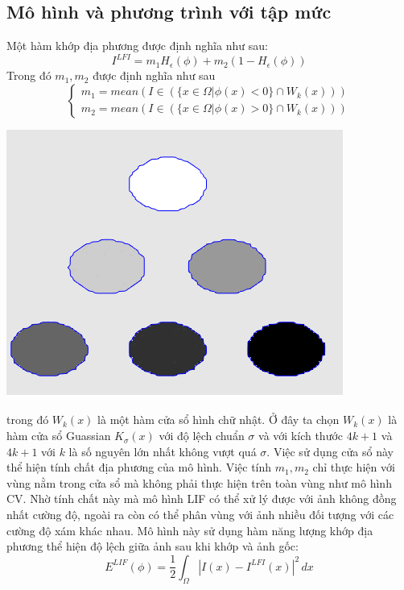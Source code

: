 \documentclass[12pt, oneside, a4]{book}
\begin{document}
\subsection{Mô hình và phương trình với tập mức}
Một hàm khớp địa phương được định nghĩa như sau:
\begin{equation*}
I^{LFI}= m_1H_{\epsilon}(\phi)+m_2(1-H_{\epsilon}(\phi))
\end{equation*}
Trong đó $m_1,m_2$ được định nghĩa như sau
\begin{equation*}
\begin{cases}
 m_1=mean(I\in (\{x\in \Omega|\phi(x)<0\}\cap W_k(x)))\\
  m_2=mean(I\in (\{x\in \Omega|\phi(x)>0\}\cap W_k(x)))
   \end{cases}
\end{equation*}
\begin{center}
\includegraphics[scale=.7]{figure/3clif1.png}
\end{center}
trong đó $W_k(x)$ là một hàm cửa sổ hình chữ nhật. Ở đây ta chọn $W_k(x)$  là hàm cửa sổ Guassian $K_{\sigma}(x)$ với độ lệch chuẩn $\sigma$ và với kích thước $4k+1$ và $4k+1$ với $k$ là số nguyên lớn nhất không vượt quá $\sigma$. Việc sử dụng cửa sổ này thể hiện tính chất địa phương của mô hình. Việc tính $m_1, m_2$ chỉ thực hiện với vùng nằm trong cửa sổ mà không phải thực hiện trên toàn vùng như mô hình CV. Nhờ tính chất này mà mô hình LIF có thể xử lý được với ảnh không đồng nhất cường độ, ngoài ra còn có thể phân vùng với ảnh nhiều đối tượng với các cường độ xám khác nhau. Mô hình này sử dụng hàm năng lượng khớp địa phương thể hiện độ lệch giữa ảnh sau khi khớp và ảnh gốc:
\begin{equation*}
E^{LIF}(\phi)=\dfrac{1}{2}\int_{\Omega}|I(x)-I^{LFI}(x)|^2\,dx
\end{equation*}
\end{document}
